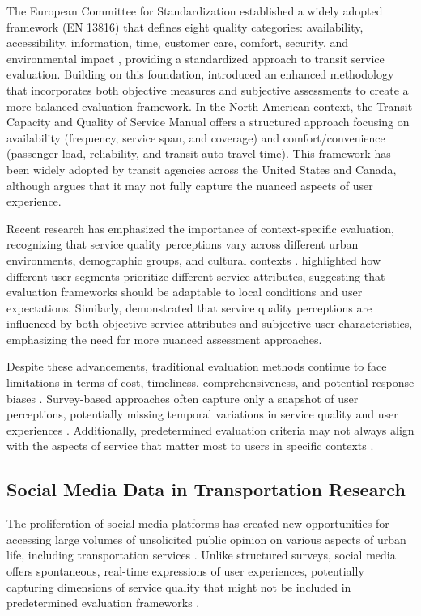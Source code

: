 \documentclass[a4paper,fleqn,12pt]{cas-sc}
\begin{document}
The European Committee for Standardization established a widely adopted framework (EN 13816) that defines eight quality categories: availability, accessibility, information, time, customer care, comfort, security, and environmental impact \citep{europeancommittee2002}, providing a standardized approach to transit service evaluation. Building on this foundation, \cite{eboli2011methodology} introduced an enhanced methodology that incorporates both objective measures and subjective assessments to create a more balanced evaluation framework. In the North American context, the Transit Capacity and Quality of Service Manual \citep{kittelson2003transit} offers a structured approach focusing on availability (frequency, service span, and coverage) and comfort/convenience (passenger load, reliability, and transit-auto travel time). This framework has been widely adopted by transit agencies across the United States and Canada, although \cite{hogstrom2016relevant} argues that it may not fully capture the nuanced aspects of user experience.

Recent research has emphasized the importance of context-specific evaluation, recognizing that service quality perceptions vary across different urban environments, demographic groups, and cultural contexts \citep{dell2018methodology, diab2017transit}. \cite{zhao2013web} highlighted how different user segments prioritize different service attributes, suggesting that evaluation frameworks should be adaptable to local conditions and user expectations. Similarly, \cite{wang2020analyzing} demonstrated that service quality perceptions are influenced by both objective service attributes and subjective user characteristics, emphasizing the need for more nuanced assessment approaches.

Despite these advancements, traditional evaluation methods continue to face limitations in terms of cost, timeliness, comprehensiveness, and potential response biases \citep{hensher2003service}. Survey-based approaches often capture only a snapshot of user perceptions, potentially missing temporal variations in service quality and user experiences \citep{chang2013exploring}. Additionally, predetermined evaluation criteria may not always align with the aspects of service that matter most to users in specific contexts \citep{van2019influence, tyrinopoulos2008public}.

\subsection{Social Media Data in Transportation Research}
The proliferation of social media platforms has created new opportunities for accessing large volumes of unsolicited public opinion on various aspects of urban life, including transportation services \citep{collins2013social, schweitzer2012social}. Unlike structured surveys, social media offers spontaneous, real-time expressions of user experiences, potentially capturing dimensions of service quality that might not be included in predetermined evaluation frameworks \citep{gal2014traveling, luong2015mining}.
\end{document}
